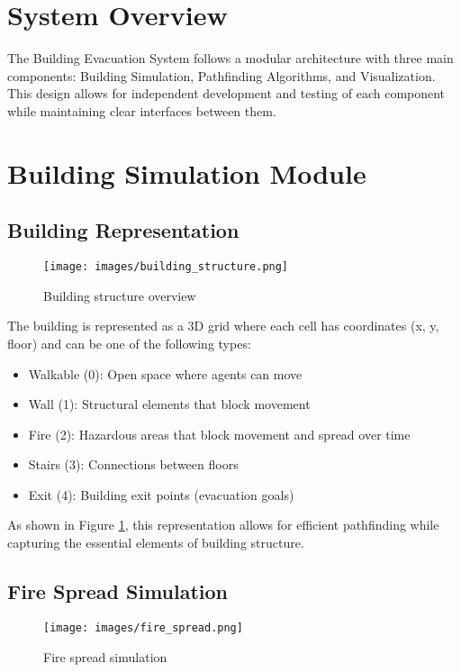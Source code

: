 \documentclass[11pt,a4paper]{report}
\begin{document}
\section{System Overview}
The Building Evacuation System follows a modular architecture with three main components: Building Simulation, Pathfinding Algorithms, and Visualization. This design allows for independent development and testing of each component while maintaining clear interfaces between them.

\section{Building Simulation Module}

\subsection{Building Representation}
\begin{figure}[H]
    \centering
    \texttt{[image: images/building\_structure.png]}
    \caption{Building structure overview}
    \label{fig:building_structure}
\end{figure}

The building is represented as a 3D grid where each cell has coordinates (x, y, floor) and can be one of the following types:
\begin{itemize}
    \item Walkable (0): Open space where agents can move
    \item Wall (1): Structural elements that block movement
    \item Fire (2): Hazardous areas that block movement and spread over time
    \item Stairs (3): Connections between floors
    \item Exit (4): Building exit points (evacuation goals)
\end{itemize}

As shown in Figure \ref{fig:building_structure}, this representation allows for efficient pathfinding while capturing the essential elements of building structure.

\subsection{Fire Spread Simulation}
\begin{figure}[H]
    \centering
    \texttt{[image: images/fire\_spread.png]}
    \caption{Fire spread simulation}
    \label{fig:fire_spread}
\end{figure}
\end{document}
